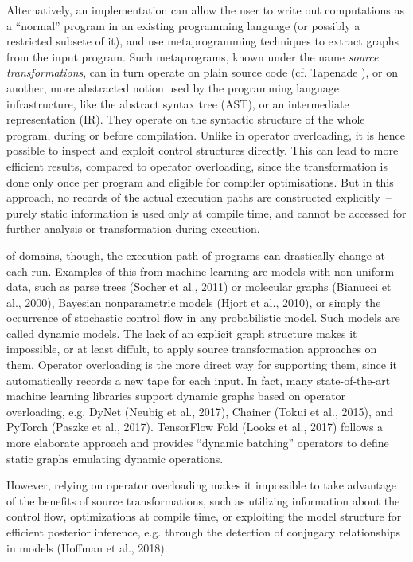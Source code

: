 Alternatively, an implementation can allow the user to write out computations as a \enquote{normal}
program in an existing programming language (or possibly a restricted subsete of it), and use
metaprogramming techniques to extract graphs from the input program.  Such metaprograms, known under
the name \emph{source transformations}, can in turn operate on plain source code (cf. Tapenade
\cite{tapenadedevelopers2019tapenade}), or on another, more abstracted notion used by the
programming language infrastructure, like the abstract syntax tree (AST), or an intermediate
representation (IR).  They operate on the syntactic structure of the whole program, during or before
compilation.  Unlike in operator overloading, it is hence possible to inspect and exploit control
structures directly. This can lead to more efficient results, compared to operator overloading,
since the transformation is done only once per program and eligible for compiler optimisations.  But
in this approach, no records of the actual execution paths are constructed explicitly~-- purely
static information is used only at compile time, and cannot be accessed for further analysis or
transformation during execution.

 of domains, though, the execution path of programs can drastically change
at each run.  Examples of this from machine learning are models with non-uniform data, such as parse
trees (Socher et al., 2011) or molecular graphs (Bianucci et al., 2000), Bayesian nonparametric
models (Hjort et al., 2010), or simply the occurrence of stochastic control flow in any
probabilistic model.  Such models are called dynamic models.  The lack of an explicit graph
structure makes it impossible, or at least diffult, to apply source transformation approaches on
them.  Operator overloading is the more direct way for supporting them, since it automatically
records a new tape for each input. In fact, many state-of-the-art machine learning libraries support
dynamic graphs based on operator overloading, e.g. DyNet (Neubig et al., 2017), Chainer (Tokui et
al., 2015), and PyTorch (Paszke et al., 2017). TensorFlow Fold (Looks et al., 2017) follows a more
elaborate approach and provides \enquote{dynamic batching} operators to define static graphs
emulating dynamic operations.

However, relying on operator overloading makes it impossible to take advantage of the benefits of
source transformations, such as utilizing information about the control flow, optimizations at
compile time, or exploiting the model structure for efficient posterior inference, e.g. through the
detection of conjugacy relationships in models (Hoffman et al., 2018).

